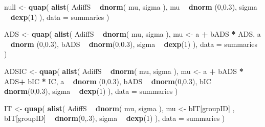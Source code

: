 \documentclass[10pt,dvipsnames,enabledeprecatedfontcommands]{scrartcl}
\newenvironment{Shaded}{\begin{snugshade}}{\end{snugshade}}
\newcommand{\DataTypeTok}[1]{\textcolor[rgb]{0.13,0.29,0.53}{#1}}
\newcommand{\DecValTok}[1]{\textcolor[rgb]{0.00,0.00,0.81}{#1}}
\newcommand{\FloatTok}[1]{\textcolor[rgb]{0.00,0.00,0.81}{#1}}
\newcommand{\KeywordTok}[1]{\textcolor[rgb]{0.13,0.29,0.53}{\textbf{#1}}}
\newcommand{\NormalTok}[1]{#1}
\newcommand{\OperatorTok}[1]{\textcolor[rgb]{0.81,0.36,0.00}{\textbf{#1}}}
\newcommand{\StringTok}[1]{\textcolor[rgb]{0.31,0.60,0.02}{#1}}
\begin{document}
\begin{Shaded}
\begin{Highlighting}[]
\NormalTok{null <-}\StringTok{ }\KeywordTok{quap}\NormalTok{(}
  \KeywordTok{alist}\NormalTok{(}
\NormalTok{    AdiffS }\OperatorTok{~}\StringTok{ }\KeywordTok{dnorm}\NormalTok{( mu, sigma ),}
\NormalTok{    mu }\OperatorTok{~}\StringTok{ }\KeywordTok{dnorm}\NormalTok{ (}\DecValTok{0}\NormalTok{,}\FloatTok{0.3}\NormalTok{),}
\NormalTok{    sigma  }\OperatorTok{~}\StringTok{ }\KeywordTok{dexp}\NormalTok{(}\DecValTok{1}\NormalTok{)}
\NormalTok{  ), }
  \DataTypeTok{data =}\NormalTok{ summaries  }
\NormalTok{)}

\NormalTok{ADS <-}\StringTok{ }\KeywordTok{quap}\NormalTok{(}
  \KeywordTok{alist}\NormalTok{(}
\NormalTok{    AdiffS }\OperatorTok{~}\StringTok{ }\KeywordTok{dnorm}\NormalTok{( mu, sigma ),}
\NormalTok{    mu <-}\StringTok{  }\NormalTok{a }\OperatorTok{+}\StringTok{ }\NormalTok{bADS }\OperatorTok{*}\StringTok{ }\NormalTok{ADS,}
\NormalTok{    a }\OperatorTok{~}\StringTok{ }\KeywordTok{dnorm}\NormalTok{ (}\DecValTok{0}\NormalTok{,}\FloatTok{0.3}\NormalTok{),}
\NormalTok{    bADS }\OperatorTok{~}\StringTok{ }\KeywordTok{dnorm}\NormalTok{(}\DecValTok{0}\NormalTok{,}\FloatTok{0.3}\NormalTok{),}
\NormalTok{    sigma  }\OperatorTok{~}\StringTok{ }\KeywordTok{dexp}\NormalTok{(}\DecValTok{1}\NormalTok{)}
\NormalTok{  ), }
  \DataTypeTok{data =}\NormalTok{ summaries}
\NormalTok{)}

\NormalTok{ADSIC <-}\StringTok{ }\KeywordTok{quap}\NormalTok{(}
  \KeywordTok{alist}\NormalTok{(}
\NormalTok{    AdiffS }\OperatorTok{~}\StringTok{ }\KeywordTok{dnorm}\NormalTok{( mu, sigma ),}
\NormalTok{    mu <-}\StringTok{  }\NormalTok{a }\OperatorTok{+}\StringTok{ }\NormalTok{bADS }\OperatorTok{*}\StringTok{ }\NormalTok{ADS}\OperatorTok{+}\StringTok{ }\NormalTok{bIC }\OperatorTok{*}\StringTok{ }\NormalTok{IC,}
\NormalTok{    a }\OperatorTok{~}\StringTok{ }\KeywordTok{dnorm}\NormalTok{ (}\DecValTok{0}\NormalTok{,}\FloatTok{0.3}\NormalTok{),}
\NormalTok{    bADS }\OperatorTok{~}\StringTok{ }\KeywordTok{dnorm}\NormalTok{(}\DecValTok{0}\NormalTok{,}\FloatTok{0.3}\NormalTok{),}
\NormalTok{    bIC }\OperatorTok{~}\StringTok{ }\KeywordTok{dnorm}\NormalTok{(}\DecValTok{0}\NormalTok{,}\FloatTok{0.3}\NormalTok{),}
\NormalTok{    sigma  }\OperatorTok{~}\StringTok{ }\KeywordTok{dexp}\NormalTok{(}\DecValTok{1}\NormalTok{)}
\NormalTok{  ), }
  \DataTypeTok{data =}\NormalTok{ summaries}
\NormalTok{)}


\NormalTok{IT <-}\StringTok{ }\KeywordTok{quap}\NormalTok{(}
  \KeywordTok{alist}\NormalTok{(}
\NormalTok{    AdiffS }\OperatorTok{~}\StringTok{ }\KeywordTok{dnorm}\NormalTok{( mu, sigma ),}
\NormalTok{    mu <-}\StringTok{  }\NormalTok{bIT[groupID] ,}
\NormalTok{    bIT[groupID] }\OperatorTok{~}\StringTok{ }\KeywordTok{dnorm}\NormalTok{(}\DecValTok{0}\NormalTok{,.}\DecValTok{3}\NormalTok{),}
\NormalTok{    sigma  }\OperatorTok{~}\StringTok{ }\KeywordTok{dexp}\NormalTok{(}\DecValTok{1}\NormalTok{)}
\NormalTok{  ), }
  \DataTypeTok{data =}\NormalTok{ summaries}
\NormalTok{)}



\end{Highlighting}
\end{Shaded}
\end{document}
